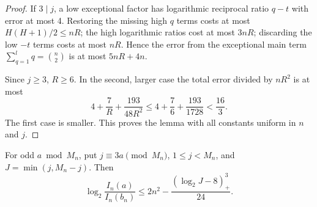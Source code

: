 \begin{proof}
If $3\mid j$, a low exceptional factor has logarithmic
reciprocal ratio $q-t$ with error at most 4.  Restoring the
missing high $q$ terms costs at most $H(H+1)/2\le nR$;
the high logarithmic ratios cost at most $3nR$; discarding
the low $-t$ terms costs at most $nR$.  Hence the error from
the exceptional main term $\sum_{q=1}^lq=\binom n2$ is at
most $5nR+4n$.

Since $j\ge3$, $R\ge6$.  In the second, larger case the total
error divided by $nR^2$ is at most
\[
                4+\frac7R+\frac{193}{48R^2}
       \le4+\frac76+\frac{193}{1728}<\frac{16}{3}.
\]
The first case is smaller.  This proves the lemma with all
constants uniform in $n$ and $j$.
\end{proof}

\begin{lemma}
For odd $a\bmod M_n$, put $j\equiv3a\pmod{M_n}$,
$1\le j<M_n$, and $J=\min(j,M_n-j)$.  Then
\[
 \log_2\frac{I_n(a)}{I_n(b_n)}
       \le 2n^2-\frac{(\log_2J-8)_+^3}{24}.
 \tag{PNEW-far}
\]
\end{lemma}
